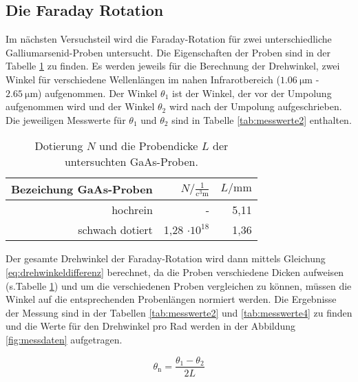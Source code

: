 \subsection{Die Faraday Rotation}
Im nächsten Versuchsteil wird die Faraday-Rotation für zwei unterschiedliche Galliumarsenid-Proben untersucht. Die Eigenschaften der Proben sind in der Tabelle \ref{tab:messwerte1} zu finden. Es werden jeweils für die Berechnung der Drehwinkel, zwei Winkel für verschiedene Wellenlängen im nahen Infrarotbereich ($\SI{1,06}{\micro\meter}$ - $\SI{2,65}{\micro\meter}$) aufgenommen. Der Winkel $\theta_{1}$ ist der Winkel, der vor der Umpolung aufgenommen wird und der Winkel $\theta_{2}$ wird nach der Umpolung aufgeschrieben. Die jeweiligen Messwerte für $\theta_{1}$ und $\theta_{2}$ sind in Tabelle \ref{tab:messwerte2} enthalten. 

\begin{table}[htpb]
	\centering
	\caption{Dotierung $N$ und die Probendicke $L$ der untersuchten GaAs-Proben.}
	\label{tab:messwerte1}
	\begin{tabular}{r|r|r}
		\toprule
		Bezeichung GaAs-Proben & $N / \frac{1}{\si{\cubic\centi\meter}}$	&	$L / \si{\milli\meter}$ \\
		\midrule
		hochrein & - & 5,11 \\
		schwach dotiert & 1,28 $\cdot 10^{18}$ & 1,36 \\
		\bottomrule
	\end{tabular}
\end{table}

Der gesamte Drehwinkel der Faraday-Rotation wird dann mittels Gleichung \ref{eq:drehwinkeldifferenz} berechnet, da die Proben verschiedene Dicken aufweisen (s.Tabelle \ref{tab:messwerte1}) und um die verschiedenen Proben vergleichen zu können, müssen die Winkel auf die entsprechenden Probenlängen normiert werden. Die Ergebnisse der Messung sind in der Tabellen \ref{tab:messwerte2} und \ref{tab:messwerte4} zu finden und die Werte für den Drehwinkel pro Rad werden in der Abbildung \ref{fig:messdaten} aufgetragen.

\begin{equation}
\label{eq:drehwinkeldifferenz}
\theta_\text{n} = \frac{\theta_{1}-\theta_{2}}{2L}
\end{equation}


